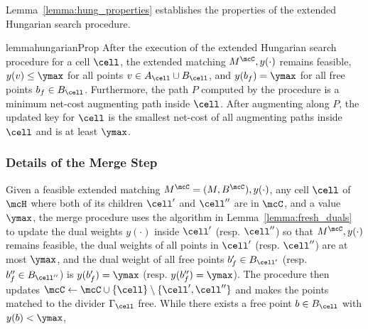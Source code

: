 Lemma~\ref{lemma:hung_properties} establishes the properties of the extended Hungarian search procedure.
\begin{restatable}{lemma}{hungarianProp}\label{lemma:hung_properties}\label{lemma:Hungarian_path}
After the execution of the extended Hungarian search procedure for a cell $\cell$, the extended matching $M^\mcC, y(\cdot)$ remains feasible, $y(v)\le \ymax$ for all points $v \in A_{\cell}\cup B_{\cell}$, and $y(b_f)=\ymax$ for all free points $b_f\in B_\cell$. Furthermore, the path $P$ computed by the procedure is a minimum net-cost augmenting path inside $\cell$. After augmenting along $P$, the updated key for $\cell$ is the smallest net-cost of all augmenting paths inside $\cell$ and is at least $\ymax$.
\end{restatable}


\subsubsection{Details of the Merge Step}\label{subsubsec:local} 
Given a feasible extended matching $M^\mcC=(M, B^\mcC), y(\cdot)$, any cell $\cell$ of $\mcH$ where both of its children $\cell'$ and $\cell''$ are in $\mcC$, and a value $\ymax$, the merge procedure uses the algorithm in Lemma~\ref{lemma:fresh_duals} to update the dual weights $y(\cdot)$ inside $\cell'$ (resp. $\cell''$)  so that $M^\mcC, y(\cdot)$ remains feasible, the dual weights of all points in $\cell'$ (resp. $\cell''$) are at most $\ymax$, and the dual weight of all free points $b'_f\in B_{\cell'}$ (resp. $b''_f\in B_{\cell''}$) is $y(b'_f)=\ymax$ (resp. $y(b''_f)=\ymax$). The procedure then updates $\mcC\leftarrow \mcC\cup \{\cell\}\setminus\{\cell', \cell''\}$ and makes the points matched to the divider $\Gamma_\cell$ free.  
While there exists a free point $b\in B_\cell$ with $y(b)<\ymax$,
